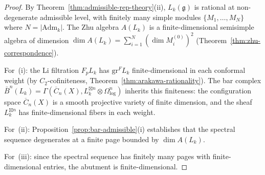 \begin{proof}
By Theorem~\ref{thm:admissible-rep-theory}(ii), $L_k(\mathfrak{g})$ is rational at non-degenerate admissible level, with finitely many simple modules $\{M_1, \ldots, M_N\}$ where $N = |\mathrm{Adm}_k|$.  The Zhu algebra $A(L_k)$ is a finite-dimensional semisimple algebra of dimension $\dim A(L_k) = \sum_{i=1}^N (\dim M_i^{(0)})^2$ (Theorem~\ref{thm:zhu-correspondence}).

For~(i): the Li filtration $F_p L_k$ has $\mathrm{gr}^F L_k$ finite-dimensional in each conformal weight (by $C_2$-cofiniteness, Theorem~\ref{thm:arakawa-rationality}).  The bar complex $\bar{B}^n(L_k) = \Gamma(\overline{C}_n(X), L_k^{\boxtimes n} \otimes \Omega^n_{\log})$ inherits this finiteness: the configuration space $\overline{C}_n(X)$ is a smooth projective variety of finite dimension, and the sheaf $L_k^{\boxtimes n}$ has finite-dimensional fibers in each weight.

For~(ii): Proposition~\ref{prop:bar-admissible}(i) establishes that the spectral sequence degenerates at a finite page bounded by $\dim A(L_k)$.

For~(iii): since the spectral sequence has finitely many pages with finite-dimensional entries, the abutment is finite-dimensional.
\end{proof}

